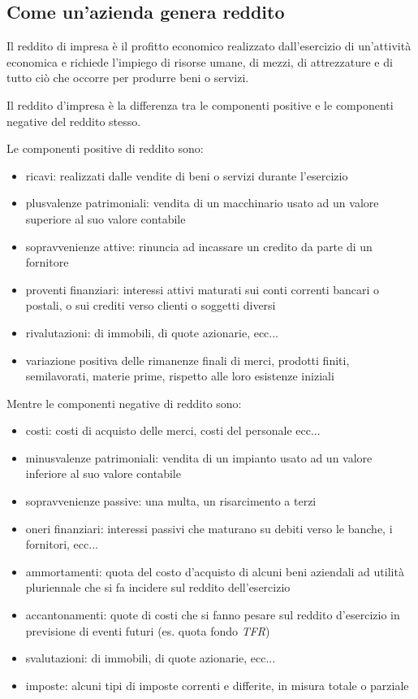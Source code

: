 \subsection{Come un'azienda genera reddito}
Il reddito di impresa è il profitto economico realizzato dall’esercizio di un’attività economica e richiede l’impiego di risorse umane, di mezzi, di attrezzature e di tutto ciò che occorre per produrre beni o servizi.

Il reddito d’impresa è la differenza tra le componenti positive e le componenti negative del reddito stesso.

Le componenti positive di reddito sono:
\begin{itemize}
	\item ricavi: realizzati dalle vendite di beni o servizi durante l’esercizio
	\item plusvalenze patrimoniali: vendita di un macchinario usato ad un valore superiore al suo valore contabile
	\item sopravvenienze attive: rinuncia ad incassare un credito da parte di un fornitore
	\item proventi finanziari: interessi attivi maturati sui conti correnti bancari o postali, o sui crediti verso clienti o soggetti diversi
	\item rivalutazioni: di immobili, di quote azionarie, ecc...
	\item variazione positiva delle rimanenze finali di merci, prodotti finiti, semilavorati, materie prime, rispetto alle loro esistenze iniziali
\end{itemize}

Mentre le componenti negative di reddito sono:
\begin{itemize}
	\item costi: costi di acquisto delle merci, costi del personale ecc...
	\item minusvalenze patrimoniali: vendita di un impianto usato ad un valore inferiore al suo valore contabile
	\item sopravvenienze passive: una multa, un risarcimento a terzi
	\item oneri finanziari: interessi passivi che maturano su debiti verso le banche, i fornitori, ecc...
	\item ammortamenti: quota del costo d’acquisto di alcuni beni aziendali ad utilità pluriennale che si fa incidere sul reddito dell’esercizio
	\item accantonamenti: quote di costi che si fanno pesare sul reddito d’esercizio in previsione di eventi futuri (es. quota fondo \textit{TFR})
	\item svalutazioni: di immobili, di quote azionarie, ecc...
	\item imposte: alcuni tipi di imposte correnti e differite, in misura totale o parziale
\end{itemize}

